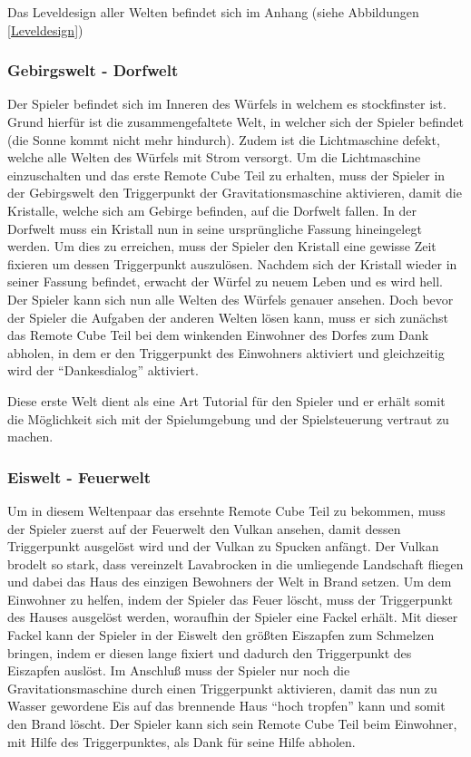 
Das Leveldesign aller Welten befindet sich im Anhang (siehe Abbildungen \ref{Leveldesign})
\subsubsection{Gebirgswelt - Dorfwelt}
Der Spieler befindet sich im Inneren des Würfels in welchem es stockfinster ist. Grund hierfür ist die zusammengefaltete Welt, in welcher sich der Spieler befindet (die Sonne kommt nicht mehr hindurch). Zudem ist die Lichtmaschine defekt, welche alle Welten des Würfels mit Strom versorgt. Um die Lichtmaschine einzuschalten und das erste Remote Cube Teil zu erhalten, muss der Spieler in der Gebirgswelt den Triggerpunkt der Gravitationsmaschine aktivieren, damit die Kristalle, welche sich am Gebirge befinden, auf die Dorfwelt fallen. In der Dorfwelt muss ein Kristall nun in seine ursprüngliche Fassung hineingelegt werden. Um dies zu erreichen, muss der Spieler den Kristall eine gewisse Zeit fixieren um dessen Triggerpunkt auszulösen. Nachdem sich der Kristall wieder in seiner Fassung befindet, erwacht der Würfel zu neuem Leben und es wird hell. Der Spieler kann sich nun alle Welten des Würfels genauer ansehen. Doch bevor der Spieler die Aufgaben der anderen Welten lösen kann, muss er sich zunächst das Remote Cube Teil bei dem winkenden Einwohner des Dorfes zum Dank abholen, in dem er den Triggerpunkt des Einwohners aktiviert und gleichzeitig wird der \enquote{Dankesdialog} aktiviert.


Diese erste Welt dient als eine Art Tutorial für den Spieler und er erhält somit die Möglichkeit sich mit der Spielumgebung und der Spielsteuerung vertraut zu machen.

\subsubsection{Eiswelt - Feuerwelt}
Um in diesem Weltenpaar das ersehnte Remote Cube Teil zu bekommen, muss der Spieler zuerst auf der Feuerwelt den Vulkan ansehen, damit dessen Triggerpunkt ausgelöst wird und der Vulkan zu Spucken anfängt. Der Vulkan brodelt so stark, dass vereinzelt Lavabrocken in die umliegende Landschaft fliegen und dabei das Haus des einzigen Bewohners der Welt in Brand setzen. Um dem Einwohner zu helfen, indem der Spieler das Feuer löscht, muss der Triggerpunkt des Hauses ausgelöst werden, woraufhin der Spieler eine Fackel erhält. Mit dieser Fackel kann der Spieler in der Eiswelt den größten Eiszapfen zum Schmelzen bringen, indem er diesen lange fixiert und dadurch den Triggerpunkt des Eiszapfen auslöst. Im Anschluß muss der Spieler nur noch die Gravitationsmaschine durch einen Triggerpunkt aktivieren, damit das nun zu Wasser gewordene Eis auf das brennende Haus \enquote{hoch tropfen} kann und somit den Brand löscht. Der Spieler kann sich sein Remote Cube Teil beim Einwohner, mit Hilfe des Triggerpunktes, als Dank für seine Hilfe abholen.

